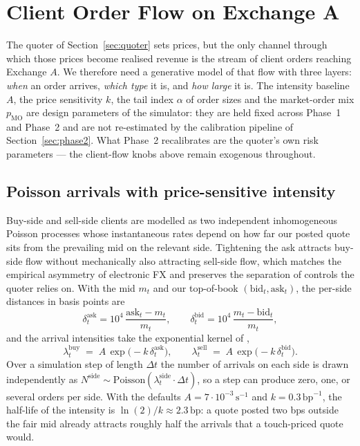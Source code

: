 \section{Client Order Flow on Exchange A}
\label{sec:client-flow}

The quoter of Section~\ref{sec:quoter} sets prices, but the only
channel through which those prices become realised revenue is the
stream of client orders reaching Exchange $A$. We therefore need a
generative model of that flow with three layers: \emph{when} an
order arrives, \emph{which type} it is, and \emph{how large} it is.
The intensity baseline $A$, the price sensitivity $k$, the tail
index $\alpha$ of order sizes and the market-order mix $p_{\mathrm{MO}}$
are design parameters of the simulator: they are held fixed across
Phase~1 and Phase~2 and are not re-estimated by the calibration
pipeline of Section~\ref{sec:phase2}. What Phase~2 recalibrates are
the quoter's own risk parameters --- the client-flow knobs above
remain exogenous throughout.

\subsection{Poisson arrivals with price-sensitive intensity}
\label{sec:client-flow-intensity}

Buy-side and sell-side clients are modelled as two independent
inhomogeneous Poisson processes whose instantaneous rates depend on
how far our posted quote sits from the prevailing mid on the
relevant side. Tightening the ask attracts buy-side flow without
mechanically also attracting sell-side flow, which matches the
empirical asymmetry of electronic FX and preserves the separation
of controls the quoter relies on. With the mid $m_t$ and our
top-of-book $(\mathrm{bid}_t, \mathrm{ask}_t)$, the per-side
distances in basis points are
\[
  \delta^{\mathrm{ask}}_t = 10^{4}\,\frac{\mathrm{ask}_t - m_t}{m_t},
  \qquad
  \delta^{\mathrm{bid}}_t = 10^{4}\,\frac{m_t - \mathrm{bid}_t}{m_t},
\]
and the arrival intensities take the exponential kernel of
\citet{avellaneda2008high},
\[
  \lambda^{\mathrm{buy}}_t \;=\; A\,\exp\!\bigl(-k\,\delta^{\mathrm{ask}}_t\bigr),
  \qquad
  \lambda^{\mathrm{sell}}_t \;=\; A\,\exp\!\bigl(-k\,\delta^{\mathrm{bid}}_t\bigr).
\]
Over a simulation step of length $\Delta t$ the number of arrivals
on each side is drawn independently as
$N^{\mathrm{side}} \sim \mathrm{Poisson}(\lambda^{\mathrm{side}}_t \cdot \Delta t)$,
so a step can produce zero, one, or several orders per side. With
the defaults $A = 7\cdot 10^{-3}\,\mathrm{s}^{-1}$ and
$k = 0.3\,\mathrm{bp}^{-1}$, the half-life of the intensity is
$\ln(2)/k \approx 2.3\,\mathrm{bp}$: a quote posted two bps outside
the fair mid already attracts roughly half the arrivals that a
touch-priced quote would.

